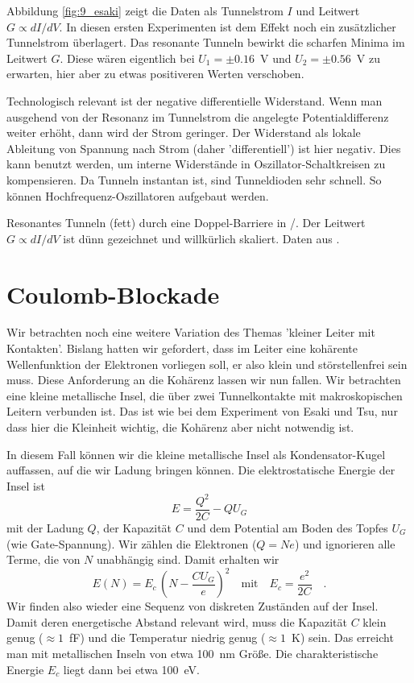 Abbildung  \ref{fig:9_esaki} zeigt die Daten als Tunnelstrom $I$ und Leitwert $G \propto dI / dV$. In diesen ersten Experimenten ist dem Effekt noch ein zusätzlicher Tunnelstrom überlagert. Das resonante Tunneln bewirkt die scharfen Minima im Leitwert $G$. Diese wären eigentlich bei $U_1 = \pm 0.16$~V und $U_2 =  \pm 0.56$~V zu erwarten, hier aber zu etwas positiveren Werten verschoben.

Technologisch relevant ist der negative differentielle Widerstand. Wenn man ausgehend von der Resonanz im Tunnelstrom die angelegte Potentialdifferenz weiter erhöht, dann wird der Strom geringer. Der Widerstand als lokale Ableitung von Spannung nach Strom (daher 'differentiell') ist hier negativ. Dies kann benutzt werden, um interne Widerstände in Oszillator-Schaltkreisen zu kompensieren. Da Tunneln instantan ist, sind Tunneldioden sehr schnell. So können Hochfrequenz-Oszillatoren aufgebaut werden.


\begin{marginfigure}
    \caption{Resonantes Tunneln (fett) durch eine Doppel-Barriere in /. Der  Leitwert $G \propto dI / dV$ ist dünn gezeichnet und willkürlich skaliert. Daten aus  \cite{Chang1974}.
    \label{fig:9_esaki}}
\end{marginfigure}

\section{Coulomb-Blockade}

Wir betrachten noch eine weitere Variation des Themas 'kleiner Leiter mit Kontakten'. Bislang hatten wir gefordert, dass im Leiter eine kohärente Wellenfunktion der Elektronen vorliegen soll, er also klein und störstellenfrei sein muss. Diese Anforderung an die Kohärenz lassen wir nun fallen. Wir betrachten eine kleine metallische Insel, die über zwei Tunnelkontakte mit makroskopischen Leitern verbunden ist. Das ist wie bei dem Experiment von Esaki und Tsu, nur dass hier die Kleinheit wichtig, die Kohärenz aber nicht notwendig ist. 

In diesem Fall können wir die kleine metallische  Insel als Kondensator-Kugel auffassen, auf die wir Ladung bringen können. Die elektrostatische Energie der Insel ist
\begin{equation}
    E = \frac{Q^2}{2 C} - Q U_G
\end{equation}
mit der Ladung $Q$, der Kapazität $C$ und dem Potential am Boden des Topfes $U_G$ (wie Gate-Spannung). Wir zählen die Elektronen ($Q = N e$) und ignorieren alle Terme, die von $N$ unabhängig sind. Damit erhalten wir
\begin{equation}
    E(N) = E_c \, \left( N - \frac{C U_G}{e} \right)^2  \quad \text{mit} \quad E_c = \frac{e^2}{2C} \quad .
\end{equation}
Wir finden also wieder eine Sequenz von diskreten Zuständen auf der Insel. Damit deren energetische Abstand relevant wird, muss die Kapazität $C$ klein genug ($\approx 1 $~fF) und die Temperatur niedrig genug ($\approx 1$~K) sein. Das erreicht man mit metallischen Inseln von etwa 100~nm Größe. Die charakteristische Energie $E_c$ liegt dann bei etwa 100~\textmu eV.

